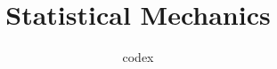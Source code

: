 \documentclass[12pt,a4paper,openany]{book}
\numberwithin{equation}{chapter}
\begin{document}
\title{Statistical Mechanics}
\author{codex}
\date{}
\maketitle
\tableofcontents
\mainmatter

















\appendix
\renewcommand{\thesection}{\Alph{section}}
\setcounter{section}{0}

\end{document}
